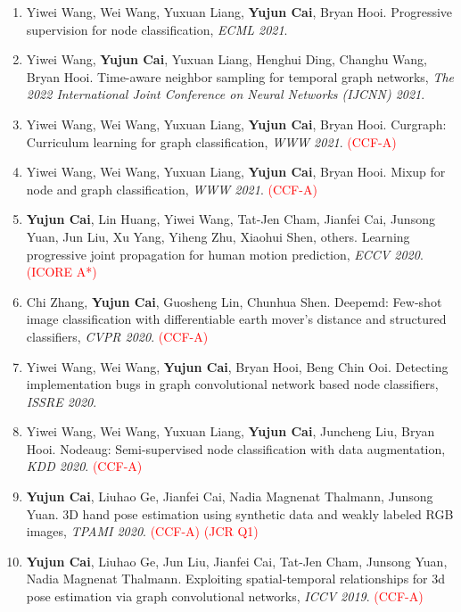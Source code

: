 \documentclass[UTF8,a4paper,11pt,fontset=fandol]{ctexart}
\begin{document}
\begin{enumerate}
\item Yiwei Wang, Wei Wang, Yuxuan Liang, \textbf{Yujun Cai}, Bryan Hooi. Progressive supervision for node classification, \textit{ECML 2021}.

\item Yiwei Wang, \textbf{Yujun Cai}, Yuxuan Liang, Henghui Ding, Changhu Wang, Bryan Hooi. Time-aware neighbor sampling for temporal graph networks, \textit{The 2022 International Joint Conference on Neural Networks (IJCNN) 2021}.

\item Yiwei Wang, Wei Wang, Yuxuan Liang, \textbf{Yujun Cai}, Bryan Hooi. Curgraph: Curriculum learning for graph classification, \textit{WWW 2021}. \textcolor{red}{(CCF-A)}

\item Yiwei Wang, Wei Wang, Yuxuan Liang, \textbf{Yujun Cai}, Bryan Hooi. Mixup for node and graph classification, \textit{WWW 2021}. \textcolor{red}{(CCF-A)}

\item \textbf{Yujun Cai}, Lin Huang, Yiwei Wang, Tat-Jen Cham, Jianfei Cai, Junsong Yuan, Jun Liu, Xu Yang, Yiheng Zhu, Xiaohui Shen, others. Learning progressive joint propagation for human motion prediction, \textit{ECCV 2020}. \textcolor{red}{(ICORE A*)}

\item Chi Zhang, \textbf{Yujun Cai}, Guosheng Lin, Chunhua Shen. Deepemd: Few-shot image classification with differentiable earth mover's distance and structured classifiers, \textit{CVPR 2020}. \textcolor{red}{(CCF-A)}

\item Yiwei Wang, Wei Wang, \textbf{Yujun Cai}, Bryan Hooi, Beng Chin Ooi. Detecting implementation bugs in graph convolutional network based node classifiers, \textit{ISSRE 2020}.

\item Yiwei Wang, Wei Wang, Yuxuan Liang, \textbf{Yujun Cai}, Juncheng Liu, Bryan Hooi. Nodeaug: Semi-supervised node classification with data augmentation, \textit{KDD 2020}. \textcolor{red}{(CCF-A)}

\item \textbf{Yujun Cai}, Liuhao Ge, Jianfei Cai, Nadia Magnenat Thalmann, Junsong Yuan. 3D hand pose estimation using synthetic data and weakly labeled RGB images, \textit{TPAMI 2020}. \textcolor{red}{(CCF-A)} \textcolor{red}{(JCR Q1)}

\item \textbf{Yujun Cai}, Liuhao Ge, Jun Liu, Jianfei Cai, Tat-Jen Cham, Junsong Yuan, Nadia Magnenat Thalmann. Exploiting spatial-temporal relationships for 3d pose estimation via graph convolutional networks, \textit{ICCV 2019}. \textcolor{red}{(CCF-A)}


\end{enumerate}
\end{document}
